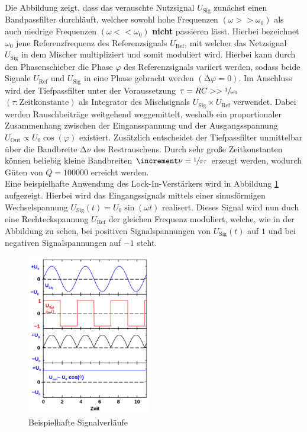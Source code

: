 \noindent Die Abbildung zeigt, dass das verauschte Nutzsignal $U_\text{Sig}$ zunächst einen Bandpassfilter durchläuft,
welcher sowohl hohe Frequenzen $\left(\omega >> \omega_0\right)$ als auch niedrige Frequenzen $\left(\omega << \omega_0\right)$
\textbf{nicht} passieren lässt. Hierbei bezeichnet $\omega_0$ jene Referenzfrequenz des Referenzsignals $U_\text{Ref}$, mit welcher 
das Netzsignal $U_\text{Sig}$ in dem Mischer multipliziert und somit moduliert wird. Hierbei kann durch den Phasenschieber die Phase  
$\varphi$ des Referenzsignals variiert werden, sodass beide Signale $U_\text{Ref}$ und $U_\text{Sig}$ in eine Phase gebracht werden 
$\left(\increment \varphi = 0\right)$. Im Anschluss wird der Tiefpassfilter unter der Voraussetzung $\tau = RC >> \sfrac{1}{\omega_0}$ 
$\left(\tau: \text{Zeitkonstante}\right)$ als Integrator des Mischsignals $U_\text{Sig} \times U_\text{Ref}$ verwendet. Dabei werden 
Rauschbeiträge weitgehend weggemittelt, weshalb ein proportionaler Zusammenhang zwischen der Eingansspannung und der Ausgangsspannung $U_\text{Out} \propto U_0\cos(\varphi)$ 
existiert. Zusätzlich entscheidet der Tiefpassfilter unmittelbar über die Bandbreite $\increment\nu$ des
Restrauschens. Durch sehr große Zeitkonstanten können beliebig kleine Bandbreiten $\increment\nu = \sfrac{1}{\pi\tau}$ erzeugt werden,
wodurch Güten von $Q = 100000$ erreicht werden.\\
Eine beispielhafte Anwendung des Lock-In-Verstärkers wird in Abbildung \ref{fig:AWD} aufgezeigt. Hierbei wird das Eingangssignals 
mittels einer sinusförmigen Wechselspannung $U_\text{Sig}(t) = U_{0}\sin(\omega t)$ realisert. Dieses Signal wird nun duch eine
Rechteckspannung $U_\text{Ref}$ der gleichen Frequenz moduliert, welche, wie in der Abbildung zu sehen, bei positiven Signalspannungen
von $U_\text{Sig}(t)$ auf $1$ und bei negativen Signalspannungen auf $-1$ steht.

\begin{figure}
    \centering
    \includegraphics[height=7cm]{./content/AWD.png}
    \caption{Beispielhafte Signalverläufe}
    \label{fig:AWD}
\end{figure}

